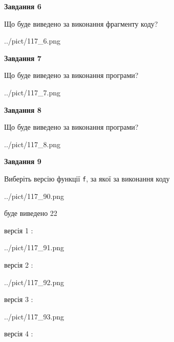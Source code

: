 \documentclass[12pt, ukrainian]{article}
\def\code#1{\Verb!#1!}
\begin{document}
{\begin {large}
{\begin {center}\textbf{Завдання 6}\end {center}}

Що буде виведено за виконання фрагменту коду?\par
\begin{center}
	{../pict/117_6.png}
\end{center}
\newpage

{\begin {center}\textbf{Завдання 7}\end {center}}

Що буде виведено за виконання програми?\par
\begin{center}
	{../pict/117_7.png}
\end{center}
\newpage

{\begin {center}\textbf{Завдання 8}\end {center}}

Що буде виведено за виконання програми?\par
\begin{center}
	{../pict/117_8.png}
\end{center}
\newpage

{\begin {center}\textbf{Завдання 9}\end {center}}

Виберіть версію функції \code{f}, за якої за виконання коду
\begin{center}
	{../pict/117_90.png}
\end{center}
буде виведено 22

\vspace{5mm}
версія 1 :

\begin{center}
	{../pict/117_91.png}
\end{center}
версія 2 :

\begin{center}
	{../pict/117_92.png}
\end{center}
версія 3 :

\begin{center}
	{../pict/117_93.png}
\end{center}
версія 4 :


\end{large}}
\end{document}
